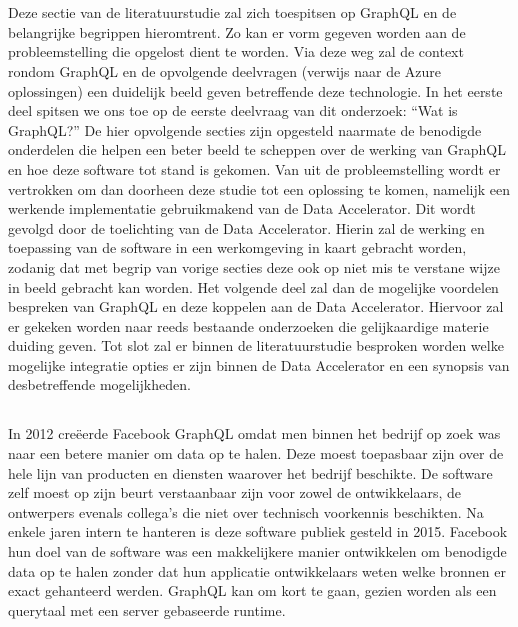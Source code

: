 \section{}%
\label{sec:GraphQL}
Deze sectie van de literatuurstudie zal zich toespitsen op GraphQL en de belangrijke begrippen hieromtrent. Zo kan er vorm gegeven worden aan de probleemstelling die opgelost dient te worden. Via deze weg zal de context rondom GraphQL en de opvolgende deelvragen (verwijs naar de Azure oplossingen) een duidelijk beeld geven betreffende deze technologie.
\newline
In het eerste deel spitsen we ons toe op de eerste deelvraag van dit onderzoek: “Wat is GraphQL?”
\newline
De hier opvolgende secties zijn opgesteld naarmate de benodigde onderdelen die helpen een beter beeld te scheppen over de werking van GraphQL en hoe deze software tot stand is gekomen. Van uit de probleemstelling wordt er vertrokken om dan doorheen deze studie tot een oplossing te komen, namelijk een werkende implementatie gebruikmakend van de Data Accelerator.
\newline
Dit wordt gevolgd door de toelichting van de Data Accelerator. Hierin zal de werking en toepassing van de software in een werkomgeving in kaart gebracht worden, zodanig dat met begrip van vorige secties deze ook op niet mis te verstane wijze in beeld gebracht kan worden.
\newline
Het volgende deel zal dan de mogelijke voordelen bespreken van GraphQL en deze koppelen aan de Data Accelerator. Hiervoor zal er gekeken worden naar reeds bestaande onderzoeken die gelijkaardige materie duiding geven.
\newline
Tot slot zal er binnen de literatuurstudie besproken worden welke mogelijke integratie opties er zijn binnen de Data Accelerator en een synopsis van desbetreffende mogelijkheden.

\subsection{}%
\label{sec:Gegevens ophalen}
In 2012 creëerde Facebook GraphQL omdat men binnen het bedrijf op zoek was naar een betere manier om data op te halen. Deze moest toepasbaar zijn over de hele lijn van producten en diensten waarover het bedrijf beschikte. De software zelf moest op zijn beurt verstaanbaar zijn voor zowel de ontwikkelaars, de ontwerpers evenals collega’s die niet over technisch voorkennis beschikten. Na enkele jaren intern te hanteren is deze software publiek gesteld in 2015. Facebook hun doel van de software was een makkelijkere manier ontwikkelen om benodigde data op te halen zonder dat hun applicatie ontwikkelaars weten welke bronnen er exact gehanteerd werden. GraphQL kan om kort te gaan, gezien worden als een querytaal met een server gebaseerde runtime.

